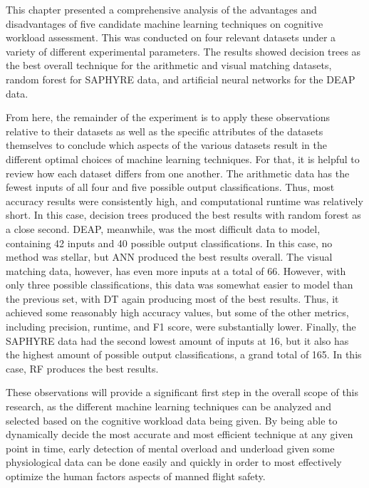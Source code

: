 \documentclass[12pt]{uthesis-v12}  %
\begin{document}
This chapter presented a comprehensive analysis of the advantages and disadvantages of five candidate machine learning techniques on cognitive workload assessment. This was conducted on four relevant datasets under a variety of different experimental parameters. The results showed decision trees as the best overall technique for the arithmetic and visual matching datasets, random forest for SAPHYRE data, and artificial neural networks for the DEAP data.

From here, the remainder of the experiment is to apply these observations relative to their datasets as well as the specific attributes of the datasets themselves to conclude which aspects of the various datasets result in the different optimal choices of machine learning techniques. For that, it is helpful to review how each dataset differs from one another. The arithmetic data has the fewest inputs of all four and five possible output classifications. Thus, most accuracy results were consistently high, and computational runtime was relatively short. In this case, decision trees produced the best results with random forest as a close second. DEAP, meanwhile, was the most difficult data to model, containing 42 inputs and 40 possible output classifications. In this case, no method was stellar, but ANN produced the best results overall. The visual matching data, however, has even more inputs at a total of 66. However, with only three possible classifications, this data was somewhat easier to model than the previous set, with DT again producing most of the best results. Thus, it achieved some reasonably high accuracy values, but some of the other metrics, including precision, runtime, and F1 score, were substantially lower. Finally, the SAPHYRE data had the second lowest amount of inputs at 16, but it also has the highest amount of possible output classifications, a grand total of 165. In this case, RF produces the best results.

These observations will provide a significant first step in the overall scope of this research, as the different machine learning techniques can be analyzed and selected based on the cognitive workload data being given. By being able to dynamically decide the most accurate and most efficient technique at any given point in time, early detection of mental overload and underload given some physiological data can be done easily and quickly in order to most effectively optimize the human factors aspects of manned flight safety.

\end{document}
